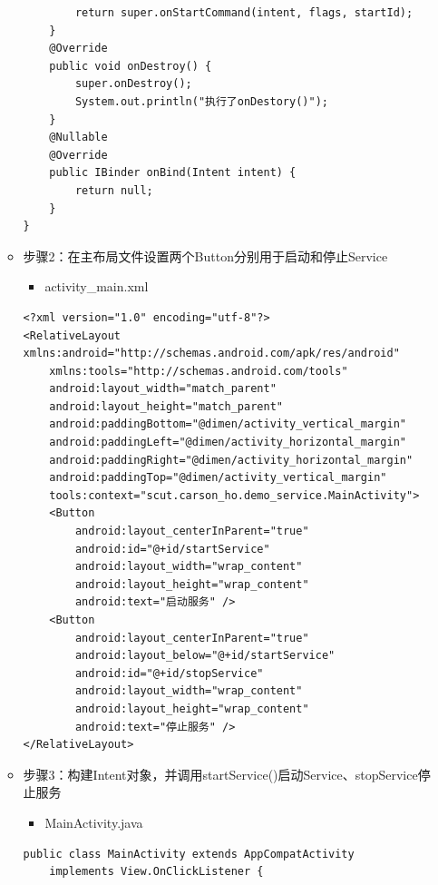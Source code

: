 \documentclass[9pt, b5paper]{article}
\begin{document}
\begin{enumerate}
\begin{itemize}
\begin{verbatim}
        return super.onStartCommand(intent, flags, startId);
    }
    @Override
    public void onDestroy() {
        super.onDestroy();
        System.out.println("执行了onDestory()");
    }
    @Nullable
    @Override
    public IBinder onBind(Intent intent) {
        return null;
    }
}
\end{verbatim}
\item 步骤2：在主布局文件设置两个Button分别用于启动和停止Service
\begin{itemize}
\item activity\_main.xml
\end{itemize}
\begin{verbatim}
<?xml version="1.0" encoding="utf-8"?>
<RelativeLayout xmlns:android="http://schemas.android.com/apk/res/android"
    xmlns:tools="http://schemas.android.com/tools"
    android:layout_width="match_parent"
    android:layout_height="match_parent"
    android:paddingBottom="@dimen/activity_vertical_margin"
    android:paddingLeft="@dimen/activity_horizontal_margin"
    android:paddingRight="@dimen/activity_horizontal_margin"
    android:paddingTop="@dimen/activity_vertical_margin"
    tools:context="scut.carson_ho.demo_service.MainActivity">
    <Button
        android:layout_centerInParent="true"
        android:id="@+id/startService"
        android:layout_width="wrap_content"
        android:layout_height="wrap_content"
        android:text="启动服务" />
    <Button
        android:layout_centerInParent="true"
        android:layout_below="@+id/startService"
        android:id="@+id/stopService"
        android:layout_width="wrap_content"
        android:layout_height="wrap_content"
        android:text="停止服务" />
</RelativeLayout>
\end{verbatim}
\item 步骤3：构建Intent对象，并调用startService()启动Service、stopService停止服务
\begin{itemize}
\item MainActivity.java
\end{itemize}
\begin{verbatim}
public class MainActivity extends AppCompatActivity
    implements View.OnClickListener {


\end{verbatim}
\end{itemize}
\end{enumerate}
\end{document}
